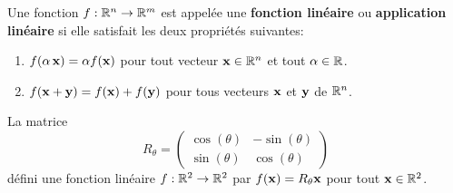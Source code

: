 {\begin{focus}{\dfn}
Une fonction $f:\mathbb{R}^n\rightarrow \mathbb{R}^m$ est appelée une
{\bfseries fonction linéaire} ou
{\bfseries application linéaire} si
elle satisfait les deux propriétés suivantes:
\begin{enumerate}
\item $f(\alpha\,\mathbf{x}) = \alpha f(\mathbf{x})$ pour tout vecteur
$\mathbf{x} \in \mathbb{R}^n$ et tout $\alpha \in \mathbb{R}$.
\item $f(\mathbf{x}+\mathbf{y}) = f(\mathbf{x}) + f(\mathbf{y})$ pour tous vecteurs
$\mathbf{x}$ et $\mathbf{y}$ de $\mathbb{R}^n$. 
\end{enumerate}
\label{funct_lin_def} 
\end{focus}

\begin{egg}
La matrice
\[
R_\theta =
\begin{pmatrix}
\cos(\theta) & -\sin(\theta) \\ \sin(\theta) & \cos(\theta)
\end{pmatrix}
\]
défini une fonction linéaire $f:\mathbb{R}^2\rightarrow \mathbb{R}^2$ par
$f(\mathbf{x})=R_\theta \mathbf{x}$ pour tout $\mathbf{x}\in \mathbb{R}^2$.


\end{egg}}
